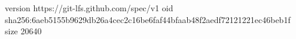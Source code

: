 version https://git-lfs.github.com/spec/v1
oid sha256:6aeb5155b9629db26a4cec2c16be6faf44bfaab48f2aedf72121221ec46beb1f
size 20640
